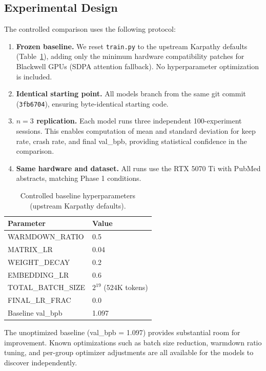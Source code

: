 \documentclass[11pt]{article}
\begin{document}
\subsection{Experimental Design}
\label{sec:phase2_design}

The controlled comparison uses the following protocol:

\begin{enumerate}[leftmargin=*]
    \item \textbf{Frozen baseline.} We reset \texttt{train.py} to the upstream Karpathy defaults (Table~\ref{tab:phase2_baseline}), adding only the minimum hardware compatibility patches for Blackwell GPUs (SDPA attention fallback). No hyperparameter optimization is included.
    \item \textbf{Identical starting point.} All models branch from the same git commit (\texttt{3fb6704}), ensuring byte-identical starting code.
    \item \textbf{$n=3$ replication.} Each model runs three independent 100-experiment sessions. This enables computation of mean and standard deviation for keep rate, crash rate, and final val\_bpb, providing statistical confidence in the comparison.
    \item \textbf{Same hardware and dataset.} All runs use the RTX 5070 Ti with PubMed abstracts, matching Phase 1 conditions.
\end{enumerate}

\begin{table}[H]
\centering
\caption{Controlled baseline hyperparameters (upstream Karpathy defaults).}
\label{tab:phase2_baseline}
\begin{tabular}{ll}
\toprule
\textbf{Parameter} & \textbf{Value} \\
\midrule
WARMDOWN\_RATIO & 0.5 \\
MATRIX\_LR & 0.04 \\
WEIGHT\_DECAY & 0.2 \\
EMBEDDING\_LR & 0.6 \\
TOTAL\_BATCH\_SIZE & $2^{19}$ (524K tokens) \\
FINAL\_LR\_FRAC & 0.0 \\
Baseline val\_bpb & 1.097 \\
\bottomrule
\end{tabular}
\end{table}

The unoptimized baseline (val\_bpb = 1.097) provides substantial room for improvement. Known optimizations such as batch size reduction, warmdown ratio tuning, and per-group optimizer adjustments are all available for the models to discover independently.
\end{document}
